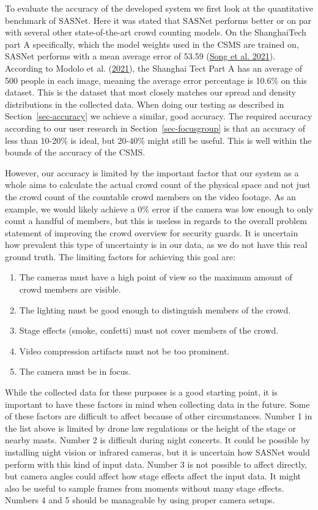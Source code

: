 \documentclass[
]{article}
\begin{document}
To evaluate the accuracy of the developed system we first look at the
quantitative benchmark of SASNet. Here it was stated that SASNet
performs better or on par with several other state-of-the-art crowd
counting models. On the ShanghaiTech part A specifically, which the
model weights used in the CSMS are trained on, SASNet performs with a
mean average error of 53.59 (\protect\hyperlink{ref-sasnet}{Song et al.
2021}). According to Modolo et al.
(\protect\hyperlink{ref-modolo2021understanding}{2021}), the Shanghai
Tect Part A has an average of 500 people in each image, meaning the
average error percentage is 10.6\% on this dataset. This is the dataset
that most closely matches our spread and density distributions in the
collected data. When doing our testing as described in
Section~\ref{sec-accuracy} we achieve a similar, good accuracy. The
required accuracy according to our user research in
Section~\ref{sec-focusgroup} is that an accuracy of less than 10-20\% is
ideal, but 20-40\% might still be useful. This is well within the bounds
of the accuracy of the CSMS.

However, our accuracy is limited by the important factor that our system
as a whole aims to calculate the actual crowd count of the physical
space and not just the crowd count of the countable crowd members on the
video footage. As an example, we would likely achieve a 0\% error if the
camera was low enough to only count a handful of members, but this is
useless in regards to the overall problem statement of improving the
crowd overview for security guards. It is uncertain how prevalent this
type of uncertainty is in our data, as we do not have this real ground
truth. The limiting factors for achieving this goal are:

\begin{enumerate}
\def\labelenumi{\arabic{enumi}.}
\item
  The cameras must have a high point of view so the maximum amount of
  crowd members are visible.
\item
  The lighting must be good enough to distinguish members of the crowd.
\item
  Stage effects (smoke, confetti) must not cover members of the crowd.
\item
  Video compression artifacts must not be too prominent.
\item
  The camera must be in focus.
\end{enumerate}

While the collected data for these purposes is a good starting point, it
is important to have these factors in mind when collecting data in the
future. Some of these factors are difficult to affect because of other
circumstances. Number 1 in the list above is limited by drone law
regulations or the height of the stage or nearby masts. Number 2 is
difficult during night concerts. It could be possible by installing
night vision or infrared cameras, but it is uncertain how SASNet would
perform with this kind of input data. Number 3 is not possible to affect
directly, but camera angles could affect how stage effects affect the
input data. It might also be useful to sample frames from moments
without many stage effects. Numbers 4 and 5 should be manageable by
using proper camera setups.
\end{document}
